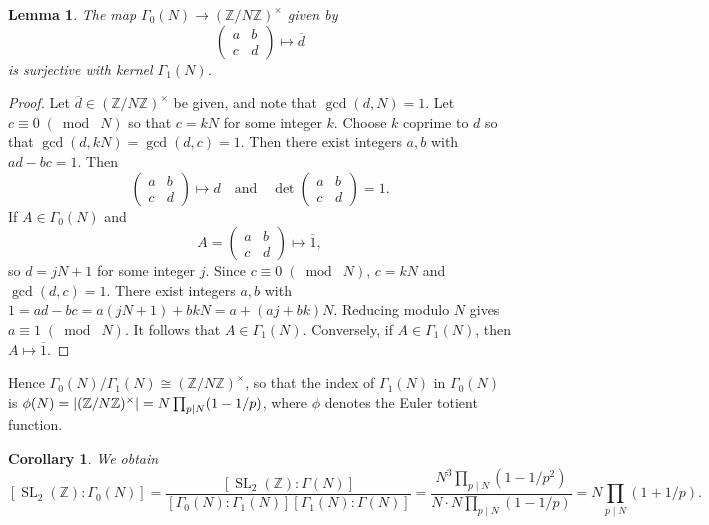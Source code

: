 \documentclass[10pt,leqno,twoside]{article}
\theoremstyle{plain}
\newtheorem{lemma}[lem]{Lemma}
\newtheorem{corollary}[lem]{Corollary}
\theoremstyle{definition}
\numberwithin{equation}{section}
\numberwithin{lem}{section}
\DeclareMathOperator{\SL}{SL}
\newcommand{\smod}[1]{\;(\bmod\; #1)}
\newcommand{\abcd}{\begin{pmatrix}
    a & b \\ c & d
\end{pmatrix}}
\newcommand{\slz}{\SL_2(\mathbb{Z})}
\begin{document}
\begin{lemma}\label{lem: gamma 1 normal in gamma 0}
    The map $\varGamma_0(N)\to (\mathbb{Z}/N\mathbb{Z})^\times$ given by \[\abcd\mapsto \overline d\] 
    is surjective with kernel $\varGamma_1(N)$.
\end{lemma}
\begin{proof}
    Let $\overline d \in (\mathbb{Z}/N\mathbb{Z})^\times$ be given, and note that $\gcd(d,N)=1$. Let $c \equiv 0\smod N$ so that $c=kN$ for some integer $k$. Choose $k$ coprime to $d$ so that $\gcd(d,kN) = \gcd(d,c) = 1$. Then there exist integers $a,b$ with $ad-bc = 1$. Then \[\begin{pmatrix}
        a & b \\ c & d
    \end{pmatrix}\mapsto d\quad\text{and}\quad \det\begin{pmatrix}
        a & b \\ c & d
    \end{pmatrix} = 1.\] 
    If $A\in \varGamma_0(N)$ and \[A = \begin{pmatrix}
        a & b \\ c & d
    \end{pmatrix}\mapsto \overline 1,\] so $d = jN+1$ for some integer $j$. Since $c\equiv 0\smod N$, $c= kN$ and $\gcd(d,c) = 1$. There exist integers $a,b$ with $1 = ad-bc = a(jN+1) + bkN = a+ (aj + bk)N$. Reducing modulo $N$ gives $a\equiv 1\smod N$. It follows that $A\in \varGamma_1(N)$. Conversely, if $A\in \varGamma_1(N)$, then $A\mapsto \overline 1$.
\end{proof}
Hence $\varGamma_0(N)/\varGamma_1(N)\cong (\mathbb{Z}/N\mathbb{Z})^\times$, so that the index of $\varGamma_1(N)$ in $\varGamma_0(N)$ is $\phi(N) = \abs{(\mathbb{Z}/N\mathbb{Z})^\times} = N\prod_{p\mid N}(1-1/p)$, where $\phi$ denotes the Euler totient function. 
\begin{corollary}
    We obtain \[[\slz : \varGamma_0(N)] = \frac{[\slz : \varGamma(N)]}{[\varGamma_0(N) : \varGamma_1(N)][\varGamma_1(N) : \varGamma(N)]} = \frac{N^3\prod_{p\mid N}(1-1/p^2)}{N\cdot N\prod_{p\mid N}(1-1/p)} = N\prod_{p\mid N}(1+1/p).\]
\end{corollary} 
\end{document}
